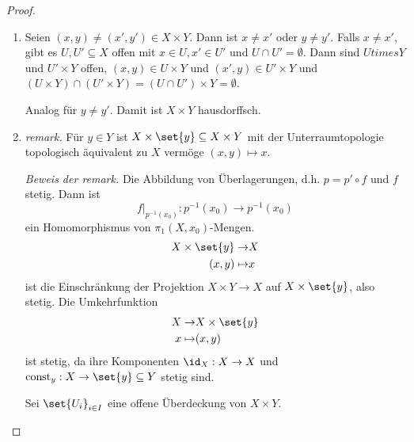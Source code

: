 \documentclass[language=ngerman]{TemplateLecture} %
\begin{document}
\begin{proof}
    \begin{enumerate}[$(i)$:]
        \item Seien $(x,y) \neq (x',y') \in X \times Y$. Dann ist $x \neq x'$ oder $y \neq y'$. Falls $x \neq x'$, gibt es $U, U' \subseteq X$ offen mit $x \in U, x' \in U'$ und $U \cap U' = \emptyset$. Dann sind $U times Y$ und $U' \times Y$ offen, $(x,y) \in U \times Y$ und $(x',y) \in U' \times Y$ und $(U \times Y) \cap (U' \times Y) = (U \cap U') \times Y = \emptyset$.
        
        Analog für $y \neq y'$. Damit ist $X \times Y$ hausdorffsch.

        \item \emph{remark.} Für $y \in Y$ ist $X \times \set{y} \subseteq X \times Y$ mit der Unterraumtopologie topologisch äquivalent zu $X$ vermöge $(x,y) \mapsto x$.
        
        \emph{Beweis der remark.} Die Abbildung von Überlagerungen, d.h. $p = p' \circ f$ und $f$ stetig. Dann ist 
        \begin{equation*}
            f|_{p^{-1}(x_0)} : p^{-1}(x_0) \to p^{-1}(x_0)
        \end{equation*} 
        ein Homomorphismus von $\pi_1(X,x_0)$-Mengen.
        \begin{align*}
            X \times \set{y} \to& X \\ 
            (x,y) \mapsto& x
        \end{align*}
        ist die Einschränkung der Projektion $X \times Y \to X$ auf $X \times \set{y}$, also stetig. Die Umkehrfunktion 
        \begin{align*}
            X \to& X \times \set{y} \\
            x \mapsto& (x,y)
        \end{align*}
        ist stetig, da ihre Komponenten $\id_X: X \to X$ und $\text{const}_y: X \to \set{y} \subseteq Y$ stetig sind.



        Sei $\set{U_i}_{i \in I}$ eine offene Überdeckung von $X \times Y$.


\end{enumerate}
\end{proof}
\end{document}
